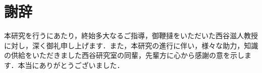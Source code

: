 \chapter*{謝辞}\label{ux8b1dux8f9e}

    本研究を行うにあたり，終始多大なるご指導，御鞭撻をいただいた西谷滋人教授に対し，深く御礼申し上げます．また，本研究の進行に伴い，様々な助力，知識の供給をいただきました西谷研究室の同輩，先輩方に心から感謝の意を示します．本当にありがとうございました．